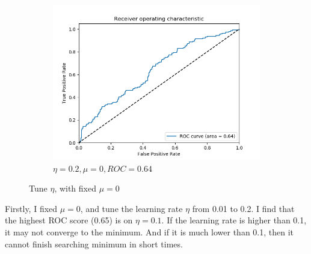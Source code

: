 \documentclass[12pt]{article}
\begin{document}
\begin{figure}[ht!]
\begin{subfigure}{.4\linewidth}
        \includegraphics[scale=0.5]{roc_0_2_0_0.png}
        \caption{$\eta = 0.2, \mu = 0, ROC = 0.64$}
    \end{subfigure}
    \caption{Tune $\eta$, with fixed $\mu = 0$ }
\end{figure}

Firstly, I fixed $\mu = 0$, and tune the learning rate $\eta$ from 0.01 to 0.2. I find that the highest ROC score (0.65) is on $\eta = 0.1$. If the learning rate is higher than 0.1, it may not converge to the minimum. And if it is much lower than 0.1, then it cannot finish searching minimum in short times.
\end{document}
